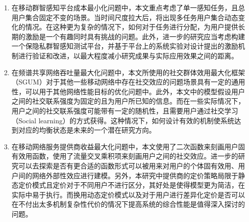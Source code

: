 \begin{enumerate}
    \item 在移动群智感知平台成本最小化问题中，本文重点考虑了单一感知任务，且总用户集合固定不变的场景。当时间尺度拉大后，将出现多任务用户集合动态变化的情况。在这种更为复杂的情况下，如何对于任务进行分配，为用户提供长期的激励是一个有趣同时具有挑战的问题。此外，进一步的研究应当考虑构建一个保隐私群智感知测试平台，并基于平台上的系统实验对设计提出的激励机制进行验证和改进，以最大程度减小研究成果与实际应用效果之间的距离。
    \item 在频谱共享网络吞吐量最大化问题中，本文所使用的社交群体效用最大化框架（SGUM）对于其他一些移动网络中存在社交效应的问题场景具有一定的通用性，可以用于其他网络性能目标的优化问题中。此外，本文中的模型假设用户之间的社交联系强度为固定的且为用户所已知的信息。而在一些实际情况下，用户之间的社交联系强度可能带有一定的随机性，且需要用户通过社交学习（Social learning）的方式获得。这种情况下，如何设计有效的机制使系统达到对应的均衡状态是未来的一个潜在研究方向。
    \item 在移动网络服务提供商收益最大化问题中，本文使用了二次函数来刻画用户固有效用函数，使用了流量交叉乘积项来刻画用户之间的社交效应。进一步的研究可以去探索是否有更合适的函数形式可以被用来对用户的个体固有效用、用户间的网络外部性效应进行建模。另外，本研究中提供商的定价策略局限于静态定价模式且定价对于不同用户不进行区分，其好处是使得模型更为简洁，在实际中易于执行。而换用动态定价模式以及对于用户进行差异化定价是否可以在不付出太多机制复杂性代价的情况下提高系统的综合性能是值得深入探讨的问题。

\end{enumerate}
